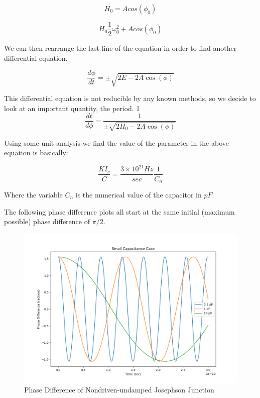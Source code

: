 \documentclass[12pt]{article}
\begin{document}
\begin{equation}
H_0 = A cos(\phi_{0})
\end{equation}

\begin{equation}
H_0 \dfrac{1}{2}\omega_0^2 + Acos(\phi_0)
\end{equation}

We can then rearrange the last line of the equation in order to find another differential equation.

\begin{equation}
\dfrac{d\phi}{dt} = \pm \sqrt{2E -  2A \cos(\phi)}
\end{equation}

This differential equation is not reducible by any known methods, so we decide to look at an important quantity, the period.
1
\begin{equation}
\dfrac{dt}{d\phi} = \dfrac{1}{\pm \sqrt{2H_0 -  2A \cos(\phi)}}
\end{equation}

Using some unit analysis we find the value of the parameter in the above equation is basically:

\begin{equation}
\dfrac{KI_c}{C} = \dfrac{3 \times 10^{21} Hz}{sec} \dfrac{1}{C_n}
\end{equation}

Where the variable $C_n$ is the numerical value of the capacitor in $pF$.

The following phase difference plots all start at the same initial (maximum possible) phase difference of $\pi / 2$.

\begin{figure}
\caption{Phase Difference of Nondriven-undamped Josephson Junction}
\begin{center}
\includegraphics[scale=0.50]{uud-jjsmallc.png}
\end{center}
\end{figure}
\end{document}
